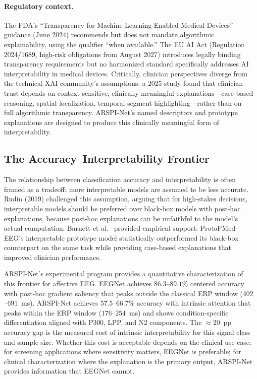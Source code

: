 \paragraph{Regulatory context.} The FDA's ``Transparency for Machine Learning-Enabled Medical Devices'' guidance (June 2024) recommends but does not mandate algorithmic explainability, using the qualifier ``when available.'' The EU AI Act (Regulation 2024/1689, high-risk obligations from August 2027) introduces legally binding transparency requirements but no harmonized standard specifically addresses AI interpretability in medical devices. Critically, clinician perspectives diverge from the technical XAI community's assumptions: a 2025 study found that clinician trust depends on context-sensitive, clinically meaningful explanations---case-based reasoning, spatial localization, temporal segment highlighting---rather than on full algorithmic transparency. ARSPI-Net's named descriptors and prototype explanations are designed to produce this clinically meaningful form of interpretability.

\subsection{The Accuracy--Interpretability Frontier}
\label{sec:accuracy_interpretability}

The relationship between classification accuracy and interpretability is often framed as a tradeoff: more interpretable models are assumed to be less accurate. Rudin (2019) challenged this assumption, arguing that for high-stakes decisions, interpretable models should be preferred over black-box models with post-hoc explanations, because post-hoc explanations can be unfaithful to the model's actual computation. Barnett et al.\ \cite{barnett_protopmed_2024} provided empirical support: ProtoPMed-EEG's interpretable prototype model statistically outperformed its black-box counterpart on the same task while providing case-based explanations that improved clinician performance.

ARSPI-Net's experimental program provides a quantitative characterization of this frontier for affective EEG. EEGNet achieves $86.3$--$89.1\%$ centered accuracy with post-hoc gradient saliency that peaks outside the classical ERP window ($402$--$691$~ms). ARSPI-Net achieves $57.5$--$66.7\%$ accuracy with intrinsic attention that peaks within the ERP window ($176$--$254$~ms) and shows condition-specific differentiation aligned with P300, LPP, and N2 components. The $\approx 20$~pp accuracy gap is the measured cost of intrinsic interpretability for this signal class and sample size. Whether this cost is acceptable depends on the clinical use case: for screening applications where sensitivity matters, EEGNet is preferable; for clinical characterization where the explanation is the primary output, ARSPI-Net provides information that EEGNet cannot.


